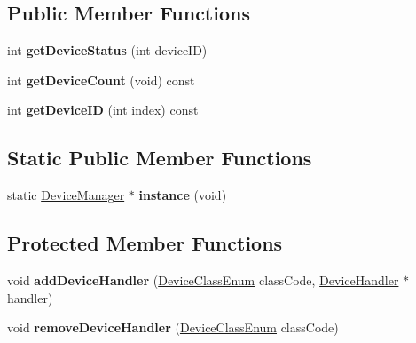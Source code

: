 \subsection*{Public Member Functions}
\begin{DoxyCompactItemize}
\item 
\mbox{\label{class_device_manager_af96ef91b388d9f62165268fa6e388e0c}} 
int {\bfseries get\+Device\+Status} (int device\+ID)
\item 
\mbox{\label{class_device_manager_a982b59b42355c617b548d1fb7b766664}} 
int {\bfseries get\+Device\+Count} (void) const
\item 
\mbox{\label{class_device_manager_a1d41fc384c0a2d87192506636440c3d1}} 
int {\bfseries get\+Device\+ID} (int index) const
\end{DoxyCompactItemize}
\subsection*{Static Public Member Functions}
\begin{DoxyCompactItemize}
\item 
\mbox{\label{class_device_manager_acce31b85af330247c7d41f278209b265}} 
static \hyperlink{class_device_manager}{Device\+Manager} $\ast$ {\bfseries instance} (void)
\end{DoxyCompactItemize}
\subsection*{Protected Member Functions}
\begin{DoxyCompactItemize}
\item 
\mbox{\label{class_device_manager_ae1ff953a62461bf8326c73fdb509d50e}} 
void {\bfseries add\+Device\+Handler} (\hyperlink{_global_defs_8h_ad17679fac69973be9b3a2787a60d7722}{Device\+Class\+Enum} class\+Code, \hyperlink{class_device_handler}{Device\+Handler} $\ast$handler)
\item 
\mbox{\label{class_device_manager_a37e887fcdbd35963fbfe00006202807f}} 
void {\bfseries remove\+Device\+Handler} (\hyperlink{_global_defs_8h_ad17679fac69973be9b3a2787a60d7722}{Device\+Class\+Enum} class\+Code)
\end{DoxyCompactItemize}
